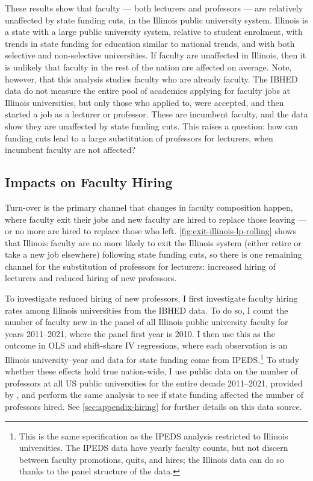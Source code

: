 These results show that faculty --- both lecturers and professors --- are relatively unaffected by state funding cuts, in the Illinois public university system.
Illinois is a state with a large public university system, relative to student enrolment, with trends in state funding for education similar to national trends, and with both selective and non-selective universities.
If faculty are unaffected in Illinois, then it is unlikely that faculty in the rest of the nation are affected on average.
Note, however, that this analysis studies faculty who are already faculty.
The IBHED data do not measure the entire pool of academics applying for faculty jobs at Illinois universities, but only those who applied to, were accepted, and then started a job as a lecturer or professor.
These are incumbent faculty, and the data show they are unaffected by state funding cuts.
This raises a question: how can funding cuts lead to a large substitution of professors for lecturers, when incumbent faculty are not affected?

\subsection{Impacts on Faculty Hiring}
Turn-over is the primary channel that changes in faculty composition happen, where faculty exit their jobs and new faculty are hired to replace those leaving --- or no more are hired to replace those who left.
\autoref{fig:exit-illinois-lp-rolling} shows that Illinois faculty are no more likely to exit the Illinois system (either retire or take a new job elsewhere) following state funding cuts, so there is one remaining channel for the substitution of professors for lecturers: increased hiring of lecturers and reduced hiring of new professors.

To investigate reduced hiring of new professors, I first investigate faculty hiring rates among Illinois universities from the IBHED data.
To do so, I count the number of faculty new in the panel of all Illinois public university faculty for years 2011--2021, where the panel first year is 2010.
I then use this as the outcome in OLS and shift-share IV regressions, where each observation is an Illinois university--year and data for state funding come from IPEDS.\footnote{
    This is the same specification as the IPEDS analysis restricted to Illinois universities.
    The IPEDS data have yearly faculty counts, but not discern between faculty promotions, quits, and hires; the Illinois data can do so thanks to the panel structure of the data.
}
To study whether these effects hold true nation-wide, I use public data on the number of professors at all US public universities for the entire decade 2011--2021, provided by \citep{wapman2022quantifying},
and perform the same analysis to see if state funding affected the number of professors hired.
See \autoref{sec:appendix-hiring} for further details on this data source.

